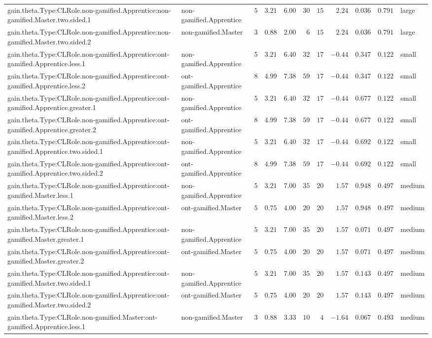 \documentclass[6pt]{article}
\begin{document}
\begin{landscape}
{\begin{longtable}{llrrrrrrrrl}
gain.theta.Type:CLRole.non-gamified.Apprentice:non-gamified.Master.two.sided.1&non-gamified.Apprentice&$ 5$&$3.21$&$ 6.00$&$ 30$&$15$&$ 2.24$&$0.036$&$0.791$&large\tabularnewline
gain.theta.Type:CLRole.non-gamified.Apprentice:non-gamified.Master.two.sided.2&non-gamified.Master&$ 3$&$0.88$&$ 2.00$&$  6$&$15$&$ 2.24$&$0.036$&$0.791$&large\tabularnewline
gain.theta.Type:CLRole.non-gamified.Apprentice:ont-gamified.Apprentice.less.1&non-gamified.Apprentice&$ 5$&$3.21$&$ 6.40$&$ 32$&$17$&$-0.44$&$0.347$&$0.122$&small\tabularnewline
gain.theta.Type:CLRole.non-gamified.Apprentice:ont-gamified.Apprentice.less.2&ont-gamified.Apprentice&$ 8$&$4.99$&$ 7.38$&$ 59$&$17$&$-0.44$&$0.347$&$0.122$&small\tabularnewline
gain.theta.Type:CLRole.non-gamified.Apprentice:ont-gamified.Apprentice.greater.1&non-gamified.Apprentice&$ 5$&$3.21$&$ 6.40$&$ 32$&$17$&$-0.44$&$0.677$&$0.122$&small\tabularnewline
gain.theta.Type:CLRole.non-gamified.Apprentice:ont-gamified.Apprentice.greater.2&ont-gamified.Apprentice&$ 8$&$4.99$&$ 7.38$&$ 59$&$17$&$-0.44$&$0.677$&$0.122$&small\tabularnewline
gain.theta.Type:CLRole.non-gamified.Apprentice:ont-gamified.Apprentice.two.sided.1&non-gamified.Apprentice&$ 5$&$3.21$&$ 6.40$&$ 32$&$17$&$-0.44$&$0.692$&$0.122$&small\tabularnewline
gain.theta.Type:CLRole.non-gamified.Apprentice:ont-gamified.Apprentice.two.sided.2&ont-gamified.Apprentice&$ 8$&$4.99$&$ 7.38$&$ 59$&$17$&$-0.44$&$0.692$&$0.122$&small\tabularnewline
gain.theta.Type:CLRole.non-gamified.Apprentice:ont-gamified.Master.less.1&non-gamified.Apprentice&$ 5$&$3.21$&$ 7.00$&$ 35$&$20$&$ 1.57$&$0.948$&$0.497$&medium\tabularnewline
gain.theta.Type:CLRole.non-gamified.Apprentice:ont-gamified.Master.less.2&ont-gamified.Master&$ 5$&$0.75$&$ 4.00$&$ 20$&$20$&$ 1.57$&$0.948$&$0.497$&medium\tabularnewline
gain.theta.Type:CLRole.non-gamified.Apprentice:ont-gamified.Master.greater.1&non-gamified.Apprentice&$ 5$&$3.21$&$ 7.00$&$ 35$&$20$&$ 1.57$&$0.071$&$0.497$&medium\tabularnewline
gain.theta.Type:CLRole.non-gamified.Apprentice:ont-gamified.Master.greater.2&ont-gamified.Master&$ 5$&$0.75$&$ 4.00$&$ 20$&$20$&$ 1.57$&$0.071$&$0.497$&medium\tabularnewline
gain.theta.Type:CLRole.non-gamified.Apprentice:ont-gamified.Master.two.sided.1&non-gamified.Apprentice&$ 5$&$3.21$&$ 7.00$&$ 35$&$20$&$ 1.57$&$0.143$&$0.497$&medium\tabularnewline
gain.theta.Type:CLRole.non-gamified.Apprentice:ont-gamified.Master.two.sided.2&ont-gamified.Master&$ 5$&$0.75$&$ 4.00$&$ 20$&$20$&$ 1.57$&$0.143$&$0.497$&medium\tabularnewline
gain.theta.Type:CLRole.non-gamified.Master:ont-gamified.Apprentice.less.1&non-gamified.Master&$ 3$&$0.88$&$ 3.33$&$ 10$&$ 4$&$-1.64$&$0.067$&$0.493$&medium\tabularnewline

\end{longtable}}
\end{landscape}
\end{document}
